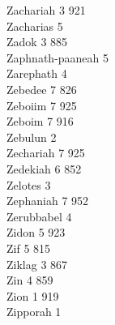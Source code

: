 Zachariah \hfill 3 \quad \phantom{0}921\\
Zacharias \hfill 5 \\
Zadok \hfill 3 \quad \phantom{0}885\\
Zaphnath-paaneah \hfill 5 \\
Zarephath \hfill 4 \\
Zebedee \hfill 7 \quad \phantom{0}826\\
Zeboiim \hfill 7 \quad \phantom{0}925\\
Zeboim \hfill 7 \quad \phantom{0}916\\
Zebulun \hfill 2 \\
Zechariah \hfill 7 \quad \phantom{0}925\\
Zedekiah \hfill 6 \quad \phantom{0}852\\
Zelotes \hfill 3 \\
Zephaniah \hfill 7 \quad \phantom{0}952\\
Zerubbabel \hfill 4 \\
Zidon \hfill 5 \quad \phantom{0}923\\
Zif \hfill 5 \quad \phantom{0}815\\
Ziklag \hfill 3 \quad \phantom{0}867\\
Zin \hfill 4 \quad \phantom{0}859\\
Zion \hfill 1 \quad \phantom{0}919\\
Zipporah \hfill 1 \\

